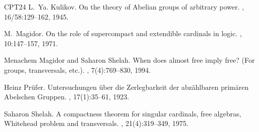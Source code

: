 \documentclass[a4paper]{amsart}
\theoremstyle{definition}
\theoremstyle{remark}
\numberwithin{equation}{section}
\begin{document}
\begin{thebibliography}{CPT24}
L.~{Ya}. Kulikov.
\newblock On the theory of {A}belian groups of arbitrary power.
, 16/58:129--162, 1945.

M.~Magidor.
\newblock On the role of supercompact and extendible cardinals in logic.
, 10:147--157, 1971.

Menachem Magidor and Saharon Shelah.
\newblock When does almost free imply free? ({F}or groups, transversals, etc.).
, 7(4):769--830, 1994.

Heinz Pr{\"u}fer.
\newblock Untersuchungen \"uber die {Z}erlegbarkeit der abz\"ahlbaren prim\"aren {A}belschen {G}ruppen.
, 17(1):35--61, 1923.

Saharon Shelah.
\newblock A compactness theorem for singular cardinals, free algebras, {W}hitehead problem and transversals.
, 21(4):319--349, 1975.

\end{thebibliography}
\end{document}
